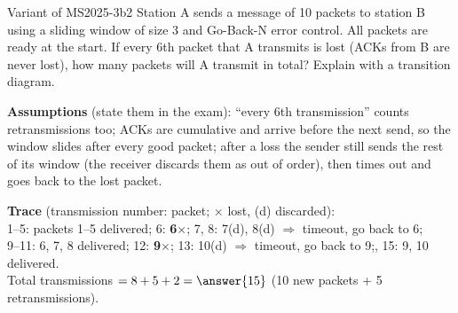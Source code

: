 \begin{question}{Variant of MS2025-3b}{2}
Station A sends a message of 10 packets to station B using a sliding window of size 3 and Go-Back-N error control. All packets are ready at the start. If every 6th packet that A transmits is lost (ACKs from B are never lost), how many packets will A transmit in total? Explain with a transition diagram.
\end{question}
\begin{solution}[15 transmissions]
\textbf{Assumptions} (state them in the exam): ``every 6th transmission'' counts retransmissions too; ACKs are cumulative and arrive before the next send, so the window slides after every good packet; after a loss the sender still sends the rest of its window (the receiver discards them as out of order), then times out and goes back to the lost packet.

\textbf{Trace} (transmission number: packet; $\times$ lost, (d) discarded):\\
1--5: packets 1--5 delivered; 6: \textbf{6}$\times$; 7, 8: 7(d), 8(d) $\Rightarrow$ timeout, go back to 6;\\
9--11: 6, 7, 8 delivered; 12: \textbf{9}$\times$; 13: 10(d) $\Rightarrow$ timeout, go back to 9;, 15: 9, 10 delivered.\\
Total transmissions $= 8 + 5 + 2 = \answer{15}$ (10 new packets + 5 retransmissions).
\end{solution}


